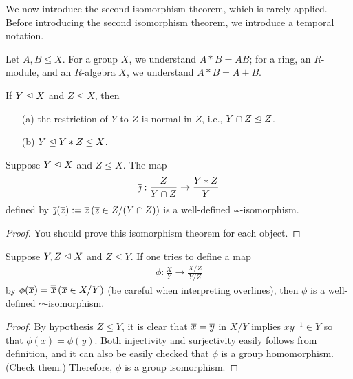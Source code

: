 We now introduce the second isomorphism theorem, which is rarely applied.
Before introducing the second isomorphism theorem, we introduce a temporal notation.
\begin{nota}
    Let $A, B\leq X$.
    For a group $X$, we understand $A*B=AB$; for a ring, an $R$-module, and an $R$-algebra $X$, we understand $A*B=A+B$.
\end{nota}
\begin{prop}
    If $Y\trianglelefteq X$ and $Z\leq X$, then
    \begin{enumerate}
        \item[(a)]
        {
            the restriction of $Y$ to $Z$ is normal in $Z$, i.e., $Y\cap Z\trianglelefteq Z$.
        }
        \item[(b)]
        {
            $Y\trianglelefteq Y*Z\leq X$.
        }
    \end{enumerate}
\end{prop}
\begin{thm}
    Suppose $Y\trianglelefteq X$ and $Z\leq X$.
    The map
    \begin{align*}
        \overline{\jmath}: \frac{Z}{Y\cap Z}\rightarrow\frac{Y*Z}{Y}
    \end{align*}
    defined by $\overline{\jmath}(\overline{z}):=\overline{z}\,(\overline{z}\in Z/(Y\cap Z))$ is a well-defined $\square\square$-isomorphism.
\end{thm}
\begin{proof}
    \color{brown}You should prove this isomorphism theorem for each object.\color{black}
\end{proof}

\begin{thm}
    Suppose $Y, Z\trianglelefteq X$ and $Z\leq Y$.
    If one tries to define a map
    \begin{align*}
        \phi: \frac{X}{Y}\rightarrow\frac{X/Z}{Y/Z}
    \end{align*}
    by $\phi(\overline{x})=\overline{\overline{x}}\,(\overline{x}\in X/Y)$ (be careful when interpreting overlines), then $\phi$ is a well-defined $\square\square$-isomorphism.
\end{thm}
\begin{proof}
    By hypothesis $Z\leq Y$, it is clear that $\overline{x}=\overline{y}$ in $X/Y$ implies $xy^{-1}\in Y$ so that $\phi(x)=\phi(y)$.
    Both injectivity and surjectivity easily follows from definition, and it can also be easily checked that $\phi$ is a group homomorphism. \color{brown}(Check them.) \color{black}
    Therefore, $\phi$ is a group isomorphism.
\end{proof}

